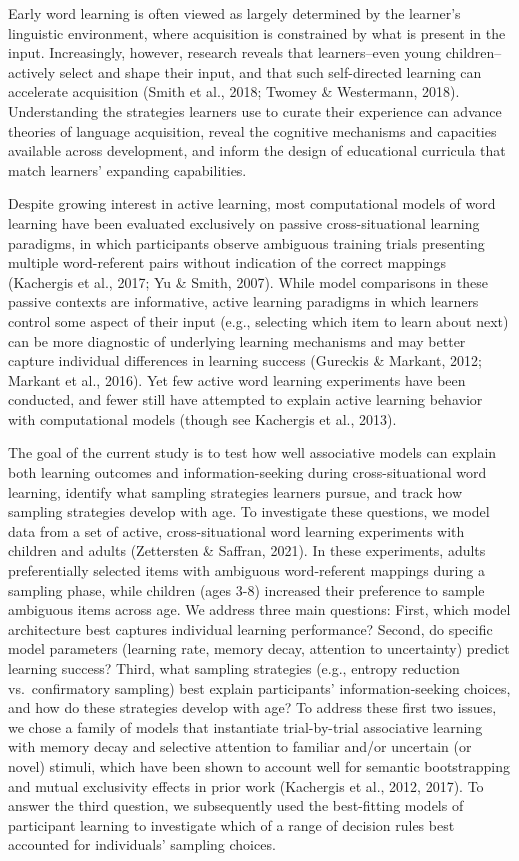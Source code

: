 \documentclass[10pt, letterpaper]{article}
\begin{document}
Early word learning is often viewed as largely determined by the
learner's linguistic environment, where acquisition is constrained by
what is present in the input. Increasingly, however, research reveals
that learners--even young children--actively select and shape their
input, and that such self-directed learning can accelerate acquisition
(Smith et al., 2018; Twomey \& Westermann, 2018). Understanding the
strategies learners use to curate their experience can advance theories
of language acquisition, reveal the cognitive mechanisms and capacities
available across development, and inform the design of educational
curricula that match learners' expanding capabilities.

Despite growing interest in active learning, most computational models
of word learning have been evaluated exclusively on passive
cross-situational learning paradigms, in which participants observe
ambiguous training trials presenting multiple word-referent pairs
without indication of the correct mappings (Kachergis et al., 2017; Yu
\& Smith, 2007). While model comparisons in these passive contexts are
informative, active learning paradigms in which learners control some
aspect of their input (e.g., selecting which item to learn about next)
can be more diagnostic of underlying learning mechanisms and may better
capture individual differences in learning success (Gureckis \& Markant,
2012; Markant et al., 2016). Yet few active word learning experiments
have been conducted, and fewer still have attempted to explain active
learning behavior with computational models (though see Kachergis et
al., 2013).

The goal of the current study is to test how well associative models can
explain both learning outcomes and information-seeking during
cross-situational word learning, identify what sampling strategies
learners pursue, and track how sampling strategies develop with age. To
investigate these questions, we model data from a set of active,
cross-situational word learning experiments with children and adults
(Zettersten \& Saffran, 2021). In these experiments, adults
preferentially selected items with ambiguous word-referent mappings
during a sampling phase, while children (ages 3-8) increased their
preference to sample ambiguous items across age. We address three main
questions: First, which model architecture best captures individual
learning performance? Second, do specific model parameters (learning
rate, memory decay, attention to uncertainty) predict learning success?
Third, what sampling strategies (e.g., entropy reduction
vs.~confirmatory sampling) best explain participants'
information-seeking choices, and how do these strategies develop with
age? To address these first two issues, we chose a family of models that
instantiate trial-by-trial associative learning with memory decay and
selective attention to familiar and/or uncertain (or novel) stimuli,
which have been shown to account well for semantic bootstrapping and
mutual exclusivity effects in prior work (Kachergis et al., 2012, 2017).
To answer the third question, we subsequently used the best-fitting
models of participant learning to investigate which of a range of
decision rules best accounted for individuals' sampling choices.
\end{document}
